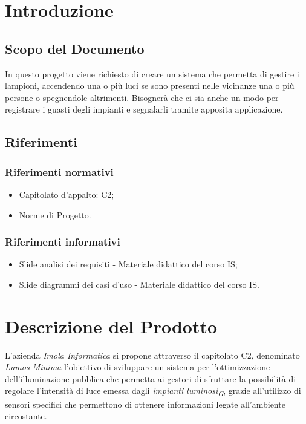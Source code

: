\documentclass[a4paper, 12pt]{article}
\begin{document}
\makeindexdetails
\makefrontpage \makeversioni
\tableofcontents
\newpage
\clearpage
{} 

\section{Introduzione}
\subsection{Scopo del Documento}
In questo progetto viene richiesto di creare un sistema che permetta di gestire i lampioni, accendendo una o più luci se sono presenti nelle vicinanze una o più persone o spegnendole altrimenti.\newline
Bisognerà che ci sia anche un modo per registrare i guasti degli impianti e segnalarli tramite apposita applicazione.

\subsection{Riferimenti}
\subsubsection*{Riferimenti normativi}
\begin{itemize}
    \item Capitolato d'appalto: C2; 
    \item Norme di Progetto.
\end{itemize}

\subsubsection*{Riferimenti informativi}
\begin{itemize}
    \item Slide analisi dei requisiti - Materiale didattico del corso IS;
    \item Slide diagrammi dei casi d'uso - Materiale didattico del corso IS.
\end{itemize}
\newpage
\section{Descrizione del Prodotto}
L'azienda \textit{Imola Informatica} si propone attraverso il capitolato C2, denominato \textit{Lumos Minima} l'obiettivo di sviluppare un sistema per l'ottimizzazione
dell'illuminazione pubblica che permetta ai gestori di sfruttare la possibilità di regolare l'intensità di luce emessa dagli \textit{impianti luminosi\textsubscript{G}}, grazie all'utilizzo di sensori specifici che permettono di ottenere informazioni legate all'ambiente circostante.
\end{document}
